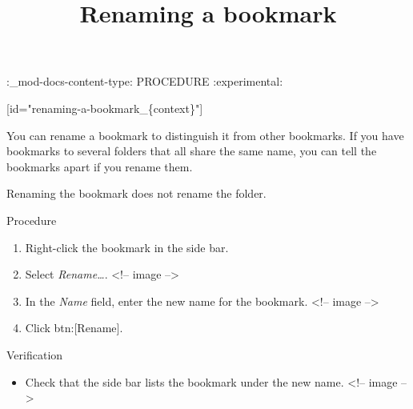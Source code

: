 \documentclass[11pt,a4paper]{article}
\title{Renaming a bookmark}
\begin{document}
\maketitle

:\_mod-docs-content-type: PROCEDURE :experimental:

[id="renaming-a-bookmark\_\{context\}"]

You can rename a bookmark to distinguish it from other bookmarks. If you have bookmarks to several folders that all share the same name, you can tell the bookmarks apart if you rename them.

Renaming the bookmark does not rename the folder.

Procedure

\begin{enumerate}
\item Right-click the bookmark in the side bar.
\item Select \textit{Rename…}.
<!-- image -->
\item In the \textit{Name} field, enter the new name for the bookmark.
<!-- image -->
\item Click btn:[Rename].
\end{enumerate}

Verification

\begin{itemize}
\item Check that the side bar lists the bookmark under the new name.
<!-- image -->
\end{itemize}
\end{document}
